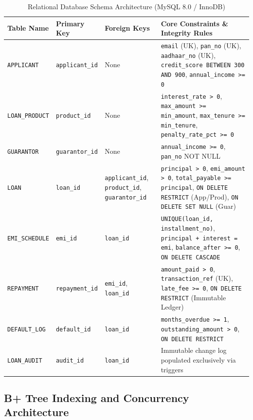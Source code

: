 \documentclass[11pt,a4paper]{report}
\begin{document}
\begin{table}[H]
    \centering
    \caption{Relational Database Schema Architecture (MySQL 8.0 / InnoDB)}
    \label{tab:schema_summary}
    \footnotesize
    \begin{tabular}{|l|l|l|p{5.5cm}|}
        \hline
        \textbf{Table Name} & \textbf{Primary Key} & \textbf{Foreign Keys} & \textbf{Core Constraints \& Integrity Rules} \\ \hline
        \texttt{APPLICANT} & \texttt{applicant\_id} & None & \texttt{email} (UK), \texttt{pan\_no} (UK), \texttt{aadhaar\_no} (UK), \texttt{credit\_score BETWEEN 300 AND 900}, \texttt{annual\_income >= 0} \\ \hline
        \texttt{LOAN\_PRODUCT} & \texttt{product\_id} & None & \texttt{interest\_rate > 0}, \texttt{max\_amount >= min\_amount}, \texttt{max\_tenure >= min\_tenure}, \texttt{penalty\_rate\_pct >= 0} \\ \hline
        \texttt{GUARANTOR} & \texttt{guarantor\_id} & None & \texttt{annual\_income >= 0}, \texttt{pan\_no} NOT NULL \\ \hline
        \texttt{LOAN} & \texttt{loan\_id} & \texttt{applicant\_id}, \texttt{product\_id}, \texttt{guarantor\_id} & \texttt{principal > 0}, \texttt{emi\_amount > 0}, \texttt{total\_payable >= principal}, \texttt{ON DELETE RESTRICT} (App/Prod), \texttt{ON DELETE SET NULL} (Guar) \\ \hline
        \texttt{EMI\_SCHEDULE} & \texttt{emi\_id} & \texttt{loan\_id} & \texttt{UNIQUE(loan\_id, installment\_no)}, \texttt{principal + interest = emi}, \texttt{balance\_after >= 0}, \texttt{ON DELETE CASCADE} \\ \hline
        \texttt{REPAYMENT} & \texttt{repayment\_id} & \texttt{emi\_id}, \texttt{loan\_id} & \texttt{amount\_paid > 0}, \texttt{transaction\_ref} (UK), \texttt{late\_fee >= 0}, \texttt{ON DELETE RESTRICT} (Immutable Ledger) \\ \hline
        \texttt{DEFAULT\_LOG} & \texttt{default\_id} & \texttt{loan\_id} & \texttt{months\_overdue >= 1}, \texttt{outstanding\_amount > 0}, \texttt{ON DELETE RESTRICT} \\ \hline
        \texttt{LOAN\_AUDIT} & \texttt{audit\_id} & \texttt{loan\_id} & Immutable change log populated exclusively via triggers \\ \hline
    \end{tabular}
\end{table}

\subsection{B+ Tree Indexing and Concurrency Architecture}
\end{document}

